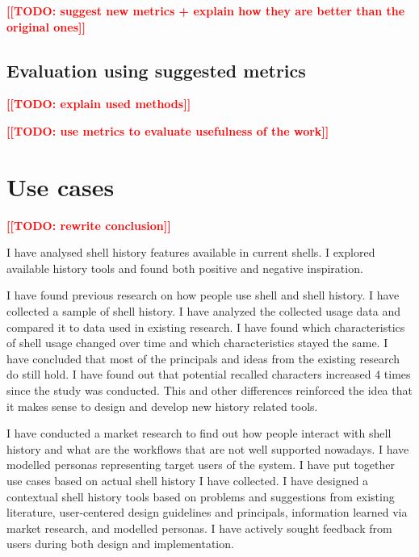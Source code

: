 \documentclass[thesis=M,english]{FITthesis}[2012/10/20]
\newcommand{\todotext}[1]{\textcolor{red}{\textbf{[[#1]]}}}
\begin{document}
\todotext{TODO: suggest new metrics + explain how they are better than the original ones}

\subsection{Evaluation using suggested metrics}

\todotext{TODO: explain used methods}

\todotext{TODO: use metrics to evaluate usefulness of the work}


\section{Use cases}



\begin{conclusion}

\todotext{TODO: rewrite conclusion}

I have analysed shell history features available in current shells. I explored available history tools and found both positive and negative inspiration.

\par I have found previous research on how people use shell and shell history.  
I have collected a sample of shell history. I have analyzed the collected usage data and compared it to data used in existing research. I have found which characteristics of shell usage changed over time and which characteristics stayed the same. I have concluded that most of the principals and ideas from the existing research do still hold. I have found out that potential recalled characters increased 4 times since the study was conducted. This and other differences reinforced the idea that it makes sense to design and develop new history related tools. 

\par I have conducted a market research to find out how people interact with shell history and what are the workflows that are not well supported nowadays. I have modelled personas representing target users of the system. I have put together use cases based on actual shell history I have collected.
I have designed a contextual shell history tools based on problems and suggestions from existing literature, user-centered design guidelines and principals, information learned via market research, and modelled personas.
I have actively sought feedback from users during both design and implementation. 


\end{conclusion}
\end{document}
